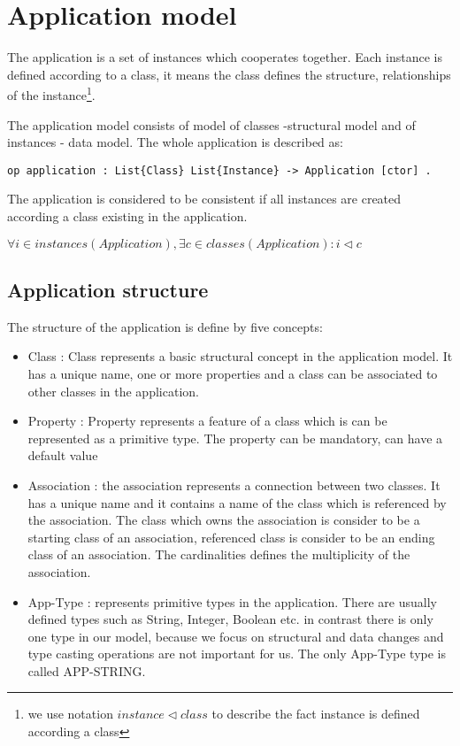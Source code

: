\documentclass[11pt]{article}
\begin{document}
\section{Application model}
The application is a set of instances which cooperates together. Each instance is defined according to a class, it means the class defines the structure, relationships of the instance\footnote{we use notation $instance \lhd class$ to describe the fact instance is defined according a class}.

The application model consists of model of classes -structural model and of instances - data model. The whole application is described as:

\begin{verbatim}
op application : List{Class} List{Instance} -> Application [ctor] .
\end{verbatim}
The application is considered to be consistent if all instances are created according a class existing in the application. 

$\forall i \in instances(Application), \exists c \in classes(Application): i \lhd c $


\subsection{Application structure}
The structure of the application is define by five concepts:
\begin{itemize}
	\item Class : Class represents a basic structural concept in the application model. It has a unique name, one or more properties and a class can be associated to other classes in the application.  
	\item Property : Property represents a feature of  a class which is can be represented as a primitive type. The property can be mandatory, can have a default value
	\item Association : the association represents a connection between two classes. It has a unique name and it contains a name of the class which is referenced by the association. The class which owns the association is consider to be a starting class of an association, referenced class is consider to be an ending class of an association. The cardinalities defines the multiplicity of the association.
	\item App-Type : represents primitive types in the application. There are usually defined types such as String, Integer, Boolean etc. in contrast there is only one type in our model, because we focus on structural and data changes and type casting operations are not important for us. The only App-Type type is called APP-STRING.
\end{itemize}
\end{document}

